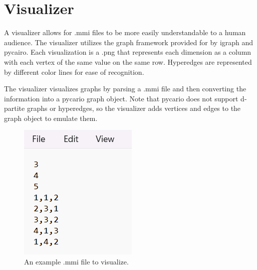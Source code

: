 \section{Visualizer}
A visualizer allows for .mmi files to be more easily understandable to a human 
audience. The visualizer utilizes the graph framework provided for by igraph and 
pycairo. Each visualization is a .png that represents each dimension as a column with each vertex of the same value on the same row. Hyperedges are represented by
different color lines for ease of recognition.

The visualizer visualizes graphs by parsing a .mmi file and then converting the information
into a pycario graph object. Note that pycario does not support d-partite graphs or hyperedges,
so the visualizer adds vertices and edges to the graph object to emulate them.

\begin{figure}[t!]
    \centering
    \begin{minipage}{0.45\textwidth}
        \centering
        \includegraphics[width=\textwidth]{images/exampleviz.png}
        \caption{An example .mmi file to visualize.}
        \label{fig:vizbase}
    \end{minipage}
    \hfill
\end{figure}

